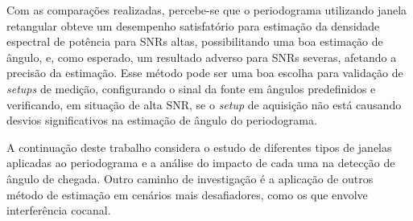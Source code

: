 \documentclass{sbrt2017port}
\begin{document}
Com as comparações realizadas, percebe-se que o periodograma utilizando janela retangular obteve um desempenho satisfatório para estimação da densidade espectral de potência para SNRs altas, possibilitando uma boa estimação de ângulo, e, como esperado, um resultado adverso para SNRs severas, afetando a precisão da estimação. Esse método pode ser uma boa escolha para validação de \textit{setups} de medição, configurando o sinal da fonte em ângulos predefinidos e verificando, em situação de alta SNR, se o \textit{setup} de aquisição não está causando desvios significativos na estimação de ângulo do periodograma.

A continuação deste trabalho considera o estudo de diferentes tipos de janelas aplicadas ao periodograma e a análise do impacto de cada uma na detecção de ângulo de chegada. Outro caminho de investigação é a aplicação de outros método de estimação em cenários mais desafiadores, como os que envolve interferência cocanal.




%




\end{document}
